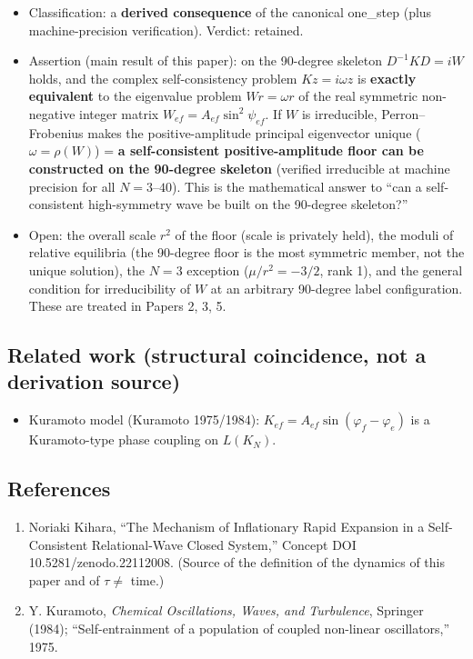 \documentclass[
  a4paper,
]{ltjsarticle}
\providecommand{\tightlist}{%
  \setlength{\itemsep}{0pt}\setlength{\parskip}{0pt}}
\begin{document}
\begin{itemize}
\tightlist
\item
  Classification: a \textbf{derived consequence} of the canonical
  one\_step (plus machine-precision verification). Verdict: retained.
\item
  Assertion (main result of this paper): on the 90-degree skeleton
  \(D^{-1}KD=iW\) holds, and the complex self-consistency problem
  \(Kz=i\omega z\) is \textbf{exactly equivalent} to the eigenvalue
  problem \(Wr=\omega r\) of the real symmetric non-negative integer
  matrix \(W_{ef}=A_{ef}\sin^2\psi_{ef}\). If \(W\) is irreducible,
  Perron--Frobenius makes the positive-amplitude principal eigenvector
  unique (\(\omega=\rho(W)\)) = \textbf{a self-consistent
  positive-amplitude floor can be constructed on the 90-degree skeleton}
  (verified irreducible at machine precision for all \(N=3\)--\(40\)).
  This is the mathematical answer to ``can a self-consistent
  high-symmetry wave be built on the 90-degree skeleton?''
\item
  Open: the overall scale \(r^2\) of the floor (scale is privately
  held), the moduli of relative equilibria (the 90-degree floor is the
  most symmetric member, not the unique solution), the \(N=3\) exception
  (\(\mu/r^2=-3/2\), rank 1), and the general condition for
  irreducibility of \(W\) at an arbitrary 90-degree label configuration.
  These are treated in Papers 2, 3, 5.
\end{itemize}

\subsection{Related work (structural coincidence, not a derivation
source)}\label{related-work-structural-coincidence-not-a-derivation-source}

\begin{itemize}
\tightlist
\item
  Kuramoto model (Kuramoto 1975/1984):
  \(K_{ef}=A_{ef}\sin(\varphi_f-\varphi_e)\) is a Kuramoto-type phase
  coupling on \(L(K_N)\).
\end{itemize}

\subsection{References}\label{references}

\begin{enumerate}
\def\labelenumi{\arabic{enumi}.}
\tightlist
\item
  Noriaki Kihara, ``The Mechanism of Inflationary Rapid Expansion in a
  Self-Consistent Relational-Wave Closed System,'' Concept DOI
  10.5281/zenodo.22112008. (Source of the definition of the dynamics of
  this paper and of \(\tau\neq\) time.)
\item
  Y. Kuramoto, \emph{Chemical Oscillations, Waves, and Turbulence},
  Springer (1984); ``Self-entrainment of a population of coupled
  non-linear oscillators,'' 1975.
\end{enumerate}
\end{document}
